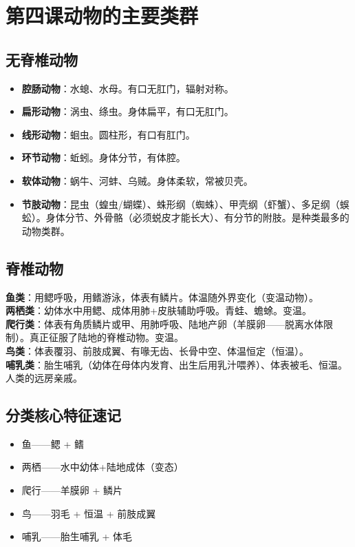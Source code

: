 \documentclass[a4paper,12pt]{ctexart}
\begin{document}
\newpage
\section{\textcolor{orange!80!black}{第四课\quad 动物的主要类群}}

\subsection*{无脊椎动物}
\begin{itemize}
  \item \textbf{腔肠动物}：水螅、水母。有口无肛门，辐射对称。
  \item \textbf{扁形动物}：涡虫、绦虫。身体扁平，有口无肛门。
  \item \textbf{线形动物}：蛔虫。圆柱形，有口有肛门。
  \item \textbf{环节动物}：蚯蚓。身体分节，有体腔。
  \item \textbf{软体动物}：蜗牛、河蚌、乌贼。身体柔软，常被贝壳。
  \item \textbf{节肢动物}：昆虫（蝗虫/蝴蝶）、蛛形纲（蜘蛛）、甲壳纲（虾蟹）、多足纲（蜈蚣）。身体分节、外骨骼（必须蜕皮才能长大）、有分节的附肢。是种类最多的动物类群。
\end{itemize}

\subsection*{脊椎动物}

\textbf{鱼类}：用鳃呼吸，用鳍游泳，体表有鳞片。体温随外界变化（变温动物）。\\
\textbf{两栖类}：幼体水中用鳃、成体用肺+皮肤辅助呼吸。青蛙、蟾蜍。变温。\\
\textbf{爬行类}：体表有角质鳞片或甲、用肺呼吸、陆地产卵（羊膜卵——脱离水体限制）。真正征服了陆地的脊椎动物。变温。\\
\textbf{鸟类}：体表覆羽、前肢成翼、有喙无齿、长骨中空、体温恒定（恒温）。\\
\textbf{哺乳类}：胎生哺乳（幼体在母体内发育、出生后用乳汁喂养）、体表被毛、恒温。人类的远房亲戚。

\subsection*{分类核心特征速记}
\begin{itemize}
  \item 鱼——鳃 + 鳍
  \item 两栖——水中幼体+陆地成体（变态）
  \item 爬行——羊膜卵 + 鳞片
  \item 鸟——羽毛 + 恒温 + 前肢成翼
  \item 哺乳——胎生哺乳 + 体毛
\end{itemize}
\end{document}
